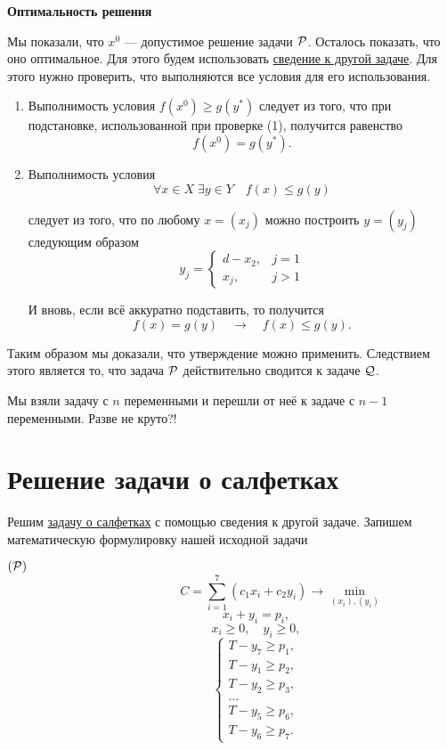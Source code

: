 \bigskip

\textbf{Оптимальность решения}

Мы показали, что $x^0$ --- допустимое решение задачи $\P$. Осталось показать, что оно оптимальное. Для этого будем использовать \hyperref[fact:reduction_to_other_problem]{сведение к другой задаче}. Для этого нужно проверить, что выполняются все условия для его использования.

\begin{enumerate}[nosep]
	\item Выполнимость условия $f(x^0) \ge g(y^*)$ следует из того, что при подстановке, использованной при проверке (1), получится равенство
	\[
	f(x^0) = g(y^*).
	\]
	
	\item Выполнимость условия
	\[
	\forall x \in X \; \exists y \in Y \quad f(x) \le g(y)
	\]
	
	следует из того, что по любому $x = (x_j)$ можно построить $y = (y_j)$ следующим образом
	\[
	y_j = \begin{cases}
		d - x_2,& j = 1 \\
		x_j,& j > 1
	\end{cases}
	\]
	
	И вновь, если всё аккуратно подставить, то получится
	\[
	f(x) = g(y) \quad \rightarrow \quad f(x) \le g(y).
	\]
\end{enumerate}

Таким образом мы доказали, что утверждение можно применить. Следствием этого является то, что задача $\P$ действительно сводится к задаче $\Q$.

Мы взяли задачу с $n$ переменными и перешли от неё к задаче с $n-1$ переменными. Разве не круто?!

\section{Решение задачи о салфетках}


Решим \hyperref[pr:napkins]{задачу о салфетках} с помощью сведения к другой задаче. Запишем математическую формулировку нашей исходной задачи

$(\P) $
\[
\qquad\qquad\qquad\qquad C = \sum_{i=1}^7 (c_1 x_i + c_2 y_i) \to \min_{(x_i), (y_i)}
\]
\[
\qquad\qquad x_i + y_i = p_i,
\]
\[
\qquad\qquad x_i \ge 0, \quad y_i \ge 0,
\]
\[
\qquad\qquad\begin{cases}
	T - y_7 \ge p_1, \\
	T - y_1 \ge p_2, \\
	T - y_2 \ge p_3, \\
	\dots \\
	T - y_5 \ge p_6, \\
	T - y_6 \ge p_7.
\end{cases}
\]

